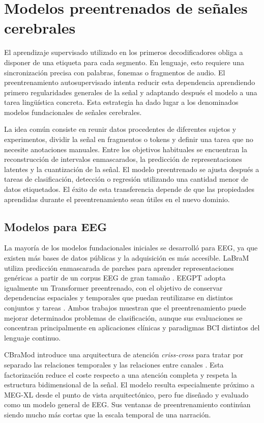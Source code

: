 \section{Modelos preentrenados de señales cerebrales}

El aprendizaje supervisado utilizado en los primeros decodificadores obliga a disponer de una etiqueta para cada segmento. En lenguaje, esto requiere una sincronización precisa con palabras, fonemas o fragmentos de audio. El preentrenamiento autosupervisado intenta reducir esta dependencia aprendiendo primero regularidades generales de la señal y adaptando después el modelo a una tarea lingüística concreta. Esta estrategia ha dado lugar a los denominados modelos fundacionales de señales cerebrales.

La idea común consiste en reunir datos procedentes de diferentes sujetos y experimentos, dividir la señal en fragmentos o tokens y definir una tarea que no necesite anotaciones manuales. Entre los objetivos habituales se encuentran la reconstrucción de intervalos enmascarados, la predicción de representaciones latentes y la cuantización de la señal. El modelo preentrenado se ajusta después a tareas de clasificación, detección o regresión utilizando una cantidad menor de datos etiquetados. El éxito de esta transferencia depende de que las propiedades aprendidas durante el preentrenamiento sean útiles en el nuevo dominio.

\subsection{Modelos para EEG}

La mayoría de los modelos fundacionales iniciales se desarrolló para EEG, ya que existen más bases de datos públicas y la adquisición es más accesible. LaBraM utiliza predicción enmascarada de parches para aprender representaciones genéricas a partir de un corpus EEG de gran tamaño \cite{jiang2024labram}. EEGPT adopta igualmente un Transformer preentrenado, con el objetivo de conservar dependencias espaciales y temporales que puedan reutilizarse en distintos conjuntos y tareas \cite{wang2024eegpt}. Ambos trabajos muestran que el preentrenamiento puede mejorar determinados problemas de clasificación, aunque sus evaluaciones se concentran principalmente en aplicaciones clínicas y paradigmas BCI distintos del lenguaje continuo.

CBraMod introduce una arquitectura de atención \textit{criss-cross} para tratar por separado las relaciones temporales y las relaciones entre canales \cite{wang2025cbramod}. Esta factorización reduce el coste respecto a una atención completa y respeta la estructura bidimensional de la señal. El modelo resulta especialmente próximo a MEG-XL desde el punto de vista arquitectónico, pero fue diseñado y evaluado como un modelo general de EEG. Sus ventanas de preentrenamiento continúan siendo mucho más cortas que la escala temporal de una narración.

